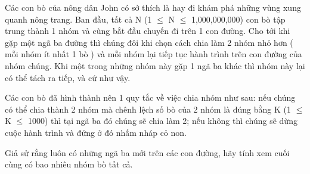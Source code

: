 Các con bò của nông dân John có sở thích là hay đi khám phá những  vùng xung quanh nông trang. Ban đầu, tất cả N (1  $\le$  N  $\le$  1,000,000,000)  con bò tập trung thành 1 nhóm và cùng bắt đầu chuyến đi trên  1 con đường. Cho tới khi gặp một ngã ba đường thì chúng đôi  khi chọn cách chia làm 2 nhóm nhỏ hơn ( mỗi nhóm ít nhất 1 bò )  và mỗi nhóm lại tiếp tục hành trình trên con đường của nhóm  chúng. Khi một trong những nhóm này gặp 1 ngã ba khác thì nhóm  này lại có thể tách ra tiếp, và cứ như vậy.  

   Các con bò đã hình thành nên 1 quy tắc về việc chia nhóm như sau: nếu  chúng có thể chia thành 2 nhóm mà chênh lệch số bò của 2 nhóm là đúng  bằng K (1  $\le$  K  $\le$  1000) thì tại ngã ba đó chúng sẽ chia làm 2; nếu  không thì chúng sẽ dừng cuộc hành trình và đứng ở đó nhấm nháp cỏ non.  

   Giả sử rằng luôn có những ngã ba mới trên các con đường, hãy  tính xem cuối cùng có bao nhiêu nhóm bò tất cả.  

\